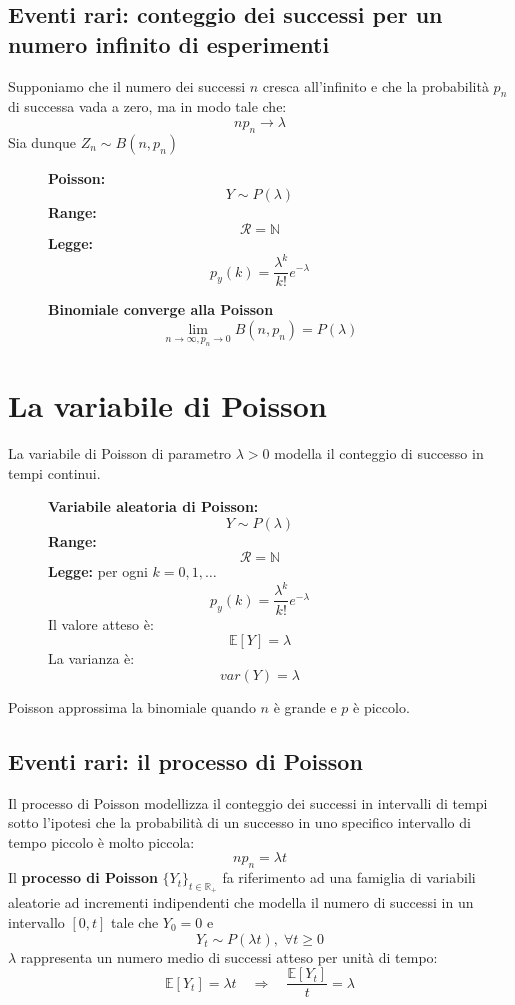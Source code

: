 \documentclass[a4paper]{article}
\theoremstyle{break}
\theoremstyle{break}
\theoremstyle{break}
\theoremstyle{break}
\begin{document}
\subsection{Eventi rari: conteggio dei successi per un numero infinito di esperimenti}
Supponiamo che il numero dei successi \( n \) cresca all'infinito e che la probabilità
\( p_n \) di successa vada a zero, ma in modo tale che:
\[
np_n \to \lambda
\] 
Sia dunque \( Z_n \sim B(n,p_n) \) 

\begin{figure}[H]
  \begin{definition}[Poisson]
    \textbf{Poisson:}
    \[
    Y \sim P(\lambda)
    \] 
    \textbf{Range:}
    \[
      \mathcal{R} = \mathbb{N}
    \] 
    \textbf{Legge:}
    \[
      p_y(k) = \frac{\lambda^k}{k!}e^{-\lambda}
    \] 
  \end{definition}
\end{figure}

\begin{figure}[H]
  \begin{definition}
    \textbf{Binomiale converge alla Poisson}
    \[
    \lim_{n \to \infty, p_n \to 0} B(n,p_n) = P(\lambda)
    \] 
  \end{definition}
\end{figure}

\section{La variabile di Poisson}
La variabile di Poisson di parametro \( \lambda > 0 \) modella il conteggio di successo
in tempi continui.
\begin{figure}[H]
  \begin{definition}
    \textbf{Variabile aleatoria di Poisson:}
    \[
    Y \sim P(\lambda)
    \] 
    \textbf{Range:}
    \[
      \mathcal{R} = \mathbb{N}
    \] 
    \textbf{Legge:} per ogni \( k = 0, 1, \ldots \) 
    \[
      p_y(k) = \frac{\lambda^k}{k!}e^{-\lambda}
    \] 
    Il valore atteso è:
    \[
      \mathbb{E}[Y] = \lambda
    \] 
    La varianza è:
    \[
    var(Y) = \lambda
    \] 
  \end{definition}
\end{figure}
Poisson approssima la binomiale quando \( n \) è grande e \( p \) è piccolo.

\subsection{Eventi rari: il processo di Poisson}
Il processo di Poisson modellizza il conteggio dei successi in intervalli di tempi
sotto l'ipotesi che la probabilità di un successo in uno specifico intervallo di tempo
piccolo è molto piccola:
\[
np_n = \lambda t
\] 
Il \textbf{processo di Poisson} \( \{Y_t\}_{t \in \mathbb{R}_+}  \) fa riferimento ad
una famiglia di variabili aleatorie ad incrementi indipendenti che modella il
numero di successi in un intervallo \( [0,t] \) tale che \( Y_0 = 0 \) e
\[
Y_t \sim P(\lambda t), \; \forall t \ge 0
\] 
\( \lambda \) rappresenta un numero medio di successi atteso per unità di tempo:
\[
  \mathbb{E}[Y_t] = \lambda t \quad \Rightarrow \quad \frac{\mathbb{E}[Y_t]}{t} = \lambda
\] 
\end{document}
